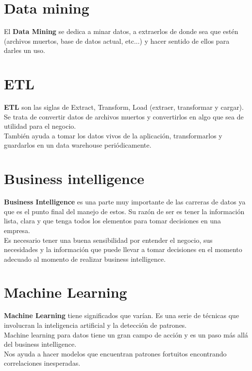 \documentclass{article}
\begin{document}
\section{Data mining}%
El \textbf{Data Mining} se dedica a minar datos, a extraerlos de donde sea que
estén (archivos muertos, base de datos actual, etc...) y hacer sentido de ellos
para darles un uso.\\


\section{ETL}%
\textbf{ETL} son las siglas de Extract, Transform, Load (extraer, transformar y
cargar). Se trata de convertir datos de archivos muertos y convertirlos en algo
que sea de utilidad para el negocio.\\

También ayuda a tomar los datos vivos de la aplicación, transformarlos y
guardarlos en un data warehouse periódicamente.\\


\section{Business intelligence}%
\textbf{Business Intelligence} es una parte muy importante de las carreras de
datos ya que es el punto final del manejo de estos. Su razón de ser es tener la
información lista, clara y que tenga todos los elementos para tomar decisiones
en una empresa.\\

Es necesario tener una buena sensibilidad por entender el negocio, sus
necesidades y la información que puede llevar a tomar decisiones en el momento
adecuado al momento de realizar business intelligence.


\section{Machine Learning}%
\textbf{Machine Learning} tiene significados que varían. Es una serie de
técnicas que involucran la inteligencia artificial y la detección de patrones.\\

Machine learning para datos tiene un gran campo de acción y es un paso más allá
del business intelligence.\\

Nos ayuda a hacer modelos que encuentran patrones fortuitos encontrando
correlaciones inesperadas.\\
\end{document}
